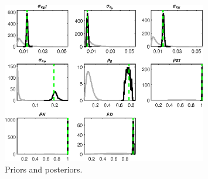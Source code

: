  
\begin{figure}[H]
\centering
\includegraphics[width=0.80\textwidth]{BRS_growth_alt/Output/BRS_growth_alt_PriorsAndPosteriors1}
\caption{Priors and posteriors.}\label{Fig:PriorsAndPosteriors:1}
\end{figure}
 
